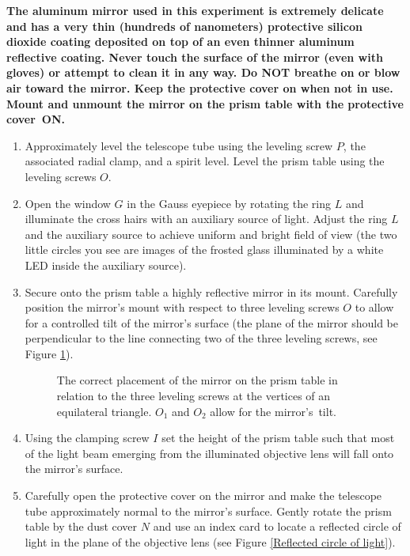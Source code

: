 \documentclass[12pt]{article}
\begin{document}
\textbf{The aluminum mirror used in this experiment is extremely delicate and has a very thin (hundreds of nanometers) protective silicon dioxide coating deposited on top of an even thinner aluminum reflective coating. Never touch the surface of the mirror (even with gloves) or attempt to clean it in any way. Do NOT breathe on or blow air toward the mirror. Keep the protective cover on when not in use. Mount and unmount the mirror on the prism table with the protective cover~ON.}
\begin{enumerate}
    \item Approximately level the telescope tube using the leveling screw $P$, the associated radial clamp, and a spirit level. Level the prism table using the leveling screws $O$.
    \item Open the window $G$ in the Gauss eyepiece by rotating the ring $L$ and illuminate the cross hairs with an auxiliary source of light. Adjust the ring $L$ and the auxiliary source to achieve uniform and bright field of view (the two little circles you see are images of the frosted glass illuminated by a white LED inside the auxiliary source).
    \item Secure onto the prism table a highly reflective mirror in its mount. Carefully position the mirror's mount with respect to three leveling screws $O$ to allow for a controlled tilt of the mirror's surface (the plane of the mirror should be perpendicular to the line connecting two of the three leveling screws, see Figure \ref{Mirror Placement}).
\begin{figure}[ht!]
    \centering
    \caption{The correct placement of the mirror on the prism table in relation to the three leveling screws at the vertices of an equilateral triangle. $O_1$ and $O_2$ allow for the mirror's~tilt.}
    \label{Mirror Placement}
\end{figure}    
    \item Using the clamping screw $I$ set the height of the prism table such that most of the light beam emerging from the illuminated objective lens will fall onto the mirror's surface.
    \item Carefully open the protective cover on the mirror and make the telescope tube approximately normal to the mirror's surface. Gently rotate the prism table by the dust cover $N$ and use an index card to locate a reflected circle of light in the plane of the objective lens (see Figure \ref{Reflected circle of light}).
    

\end{enumerate}
\end{document}
